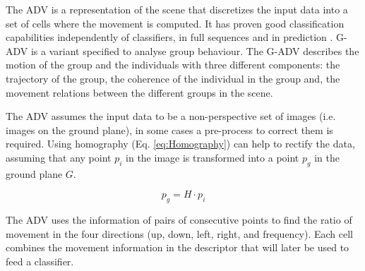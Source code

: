 The ADV \cite{azorin2013,azorin2015} is a representation of the scene that discretizes the input data into a set of cells where the movement is computed. It has proven good classification capabilities independently of classifiers, in full sequences and in prediction \cite{azorin2014predictive}. G-ADV \cite{azorin2016} is a variant specified to analyse group behaviour. The G-ADV describes the motion of the group and the individuals with three different components: the trajectory of the group, the coherence of the individual in the group and, the movement relations between the different groups in the scene.

The ADV assumes the input data to be a non-perspective set of images (i.e. images on the ground plane), in some cases a pre-process to correct them is required. Using homography (Eq. \ref{eq:Homography}) can help to rectify the data, assuming that any point $p_i$ in the image is transformed into a point $p_g$ in the ground plane $G$.


\begin{equation}\label{eq:Homography}
    p_g = H \cdot p_i
\end{equation}

The ADV uses the information of pairs of consecutive points to find the ratio of movement in the four directions (up, down, left, right, and frequency). Each cell combines the movement information in the descriptor that will later be used to feed a classifier. 

